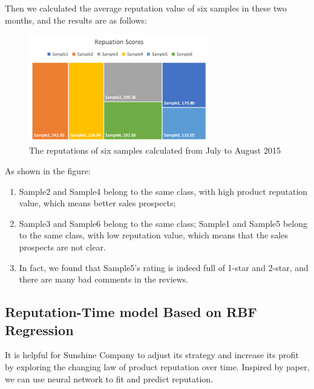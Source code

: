 \documentclass{mcmthesis}
\begin{document}
Then we calculated the average reputation value of six samples in these two months, and the results are as follows:
\begin{figure}[H] 
	\centering 
	\includegraphics[width=0.7\textwidth]{figures/reputations.png} 
	\caption{The reputations of six samples calculated from July to August 2015}
	\label{reputations} %
\end{figure}

As shown in the figure:
\begin{enumerate}
	\item Sample2 and Sample4 belong to the same class, with high product reputation value, which means better sales prospects; 
	\item Sample3 and Sample6 belong to the same class; Sample1 and Sample5 belong to the same class, with low reputation value, which means that the sales prospects are not clear.
	\item  In fact, we found that Sample5's rating is indeed full of 1-star and 2-star, and there are many bad comments in the reviews.
\end{enumerate}

\subsection{Reputation-Time model Based on RBF Regression}
It is helpful for Sunshine Company to adjust its strategy and increase its profit by exploring the changing law of product reputation over time. Inspired by paper\cite{tang2015user}, we can use neural network to fit and predict reputation.
\end{document}
